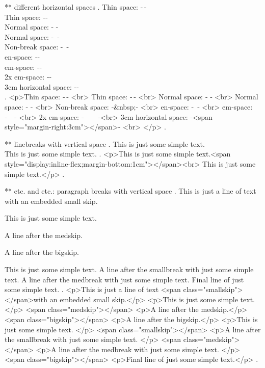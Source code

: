 ** different horizontal spaces
.
Thin space: -\,- \\
Thin space: -\thinspace- \\
Normal space: - - \\
Normal space: -\ - \\
Non-break space: -~- \\
en-space: -\enspace- \\
em-space: -\quad- \\
2x em-space: -\qquad-\\
3cm horizontal space: -\hspace{3cm}- \\
.
<p>Thin space: ‐ ‐ <br>
Thin space: ‐ ‐ <br>
Normal space: ‐ ‐ <br>
Normal space: ‐​ ‐ <br>
Non‐break space: ‐&nbsp;‐ <br>
en‐space: ‐ ‐ <br>
em‐space: ‐ ‐ <br>
2x em‐space: ‐  ‐<br>
3cm horizontal space: ‐<span style="margin-right:3cm"></span>‐ <br>
</p>
.


** linebreaks with vertical space
.
This is just some simple text.\\[1cm]
This is just some simple text.
.
<p>This is just some simple text.<span style="display:inline-flex;margin-bottom:1cm"></span><br>
This is just some simple text.</p>
.


** \smallskip etc. and \smallbreak etc.: paragraph breaks with vertical space
.
This is just a line of text \smallskip with an embedded small skip.

This is just some simple text.

\medskip
A line after the medskip.

\bigskip

A line after the bigskip.

This is just some simple text.
\smallbreak
A line after the smallbreak with just some simple text.
\medbreak
A line after the medbreak with just some simple text.
\bigbreak
Final line of just some simple text.
.
<p>This is just a line of text <span class="smallskip"></span>with an embedded small skip.</p>
<p>This is just some simple text.</p>
<span class="medskip"></span>
<p>A line after the medskip.</p>
<span class="bigskip"></span>
<p>A line after the bigskip.</p>
<p>This is just some simple text. </p>
<span class="smallskip"></span>
<p>A line after the smallbreak with just some simple text. </p>
<span class="medskip"></span>
<p>A line after the medbreak with just some simple text. </p>
<span class="bigskip"></span>
<p>Final line of just some simple text.</p>
.
